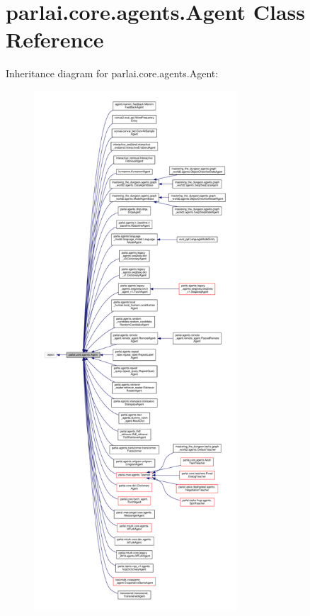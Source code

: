 \hypertarget{classparlai_1_1core_1_1agents_1_1Agent}{}\section{parlai.\+core.\+agents.\+Agent Class Reference}
\label{classparlai_1_1core_1_1agents_1_1Agent}


Inheritance diagram for parlai.\+core.\+agents.\+Agent\+:
\nopagebreak
\begin{figure}[H]
\begin{center}
\leavevmode
\includegraphics[height=550pt]{classparlai_1_1core_1_1agents_1_1Agent__inherit__graph}
\end{center}
\end{figure}


